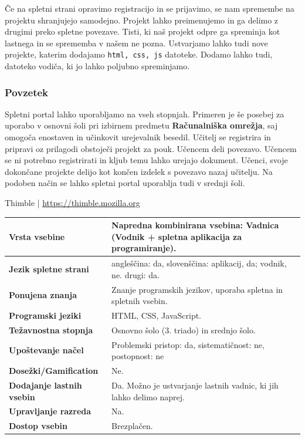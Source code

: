  Če na spletni strani opravimo registracijo in se prijavimo, se nam
 spremembe na projektu shranjujejo samodejno. Projekt lahko
 preimenujemo in ga delimo z drugimi preko spletne povezave. Tisti, ki
 naš projekt odpre ga spreminja kot lastnega in se sprememba v našem
 ne pozna. Ustvarjamo lahko tudi nove projekte, katerim dodajamo
 \texttt{html, css, js} datoteke. Dodamo lahko tudi, datoteko vodiča,
 ki jo lahko poljubno spreminjamo.
 
\subsubsection{Povzetek}
\label{sec:povzetek_thimble}

Spletni portal lahko uporabljamo na vseh stopnjah. Primeren je še
posebej za uporabo v osnovni šoli pri izbirnem predmetu
\textbf{Računalniška omrežja}, saj omogoča enostaven in učinkovit
urejevalnik besedil. Učitelj se registrira in pripravi oz prilagodi
obstoječi projekt za pouk. Učencem deli povezavo. Učencem se ni
potrebno registrirati in kljub temu lahko urejajo dokument. Učenci,
svoje dokončane projekte delijo kot končen izdelek s povezavo nazaj
učitelju. Na podoben način se lahko spletni portal uporablja tudi v
srednji šoli.

\begin{osebnabox}[label={osebna:thimble}]{Thimble |
    \url{https://thimble.mozilla.org}}
    \begin{tabular}{
  p{} |
  p{}  }
  \textbf{Vrsta vsebine} & Napredna kombinirana vsebina: Vadnica
                           (Vodnik + spletna aplikacija za
                           programiranje).   \\
      \hline
  \textbf{Jezik spletne strani} & angleščina: da, slovenščina:
                                  aplikacij, da; vodnik, ne. 
                                  drugi: da. \\
      \hline
  \textbf{Ponujena znanja} & Znanje programskih jezikov, uporaba
                             spletna in spletnih vsebin. \\
      \hline
 \textbf{Programski jeziki} & HTML, CSS, JavaScript. \\
      \hline
  \textbf{Težavnostna stopnja} & Osnovno šolo (3. triado) in srednjo
                                 šolo. \\
      \hline
   \textbf{Upoštevanje načel} & Problemski pristop: da,
                                sistematičnost: ne, postopnost: ne \\
      \hline
  \textbf{Dosežki/Gamification} & Ne. \\
      \hline
  \textbf{Dodajanje lastnih vsebin} & Da. Možno je ustvarjanje lastnih
                                      vadnic, ki jih lahko delimo
                                      naprej.  \\
      \hline
  \textbf{Upravljanje razreda} & Na. \\
      \hline
  \textbf{Dostop vsebin} & Brezplačen. \\

\end{tabular}
\end{osebnabox}


